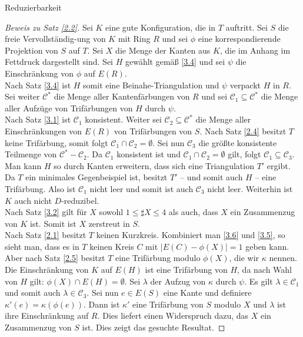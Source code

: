 \begin{section}{Reduzierbarkeit}
 \begin{proof}[Beweis zu Satz \ref{2.2}]
  Sei $K$ eine gute Konfiguration, die in $T$ auftritt. Sei $S$ die freie Vervollständig-ung von $K$ mit Ring $R$ und sei $\phi$ eine korrespondierende Projektion von $S$ auf $T$. Sei $X$ die Menge der Kanten aus $K$, die im Anhang im Fettdruck dargestellt sind. Sei $H$ gewählt gemäß \ref{3.4} und sei $\psi$ die Einschränkung von $\phi$ auf $E(R)$.\\
  Nach Satz \ref{3.4} ist $H$ somit eine Beinahe-Triangulation und $\psi$ verpackt $H$ in $R$. Sei weiter $\mathscr{C}^*$ die Menge aller Kantenfärbungen von $R$ und sei $\mathscr{C}_1 \subseteq \mathscr{C}^*$ die Menge aller Aufzüge von Trifärbungen von $H$ durch $\psi$.\\
  Nach Satz \ref{3.1} ist $\mathscr{C}_1$ konsistent. Weiter sei $\mathscr{C}_2 \subseteq \mathscr{C}^*$ die Menge aller Einschränkungen von $E(R)$ von Trifärbungen von $S$. Nach Satz \ref{2.4} besitzt $T$ keine Trifärbung, somit folgt $\mathscr{C}_1 \cap \mathscr{C}_2 = \emptyset$. Sei nun $\mathscr{C}_3$ die größte konsistente Teilmenge von $\mathscr{C}^* - \mathscr{C}_2$. Da $\mathscr{C}_1$ konsistent ist und $\mathscr{C}_1 \cap \mathscr{C}_2 = \emptyset$ gilt, folgt $\mathscr{C}_1 \subseteq \mathscr{C}_3$.\\
  Man kann $H$ so durch Kanten erweitern, dass sich eine Triangulation $T'$ ergibt. Da $T$ ein minimales Gegenbeispiel ist, besitzt $T'$ -- und somit auch $H$ -- eine Trifärbung. Also ist $\mathscr{C}_1$ nicht leer und somit ist auch $\mathscr{C}_3$ nicht leer. Weiterhin ist $K$ auch nicht $D$-reduzibel.\\
  Nach Satz \ref{3.2} gilt für $X$ sowohl $1 \leq \sharp X \leq 4$ als auch, dass $X$ ein Zusammenzug von $K$ ist. Somit ist $X$ zerstreut in $S$. \\
  Nach Satz \ref{2.1} besitzt $T$ keinen Kurzkreis. Kombiniert man \ref{3.6} und \ref{3.5}, so sieht man, dass es in $T$ keinen Kreis $C$ mit $|E(C) - \phi(X)| = 1$ geben kann. Aber nach Satz \ref{2.5} besitzt $T$ eine Trifärbung modulo $\phi(X)$, die wir $\kappa$ nennen. Die Einschränkung von $K$ auf $E(H)$ ist eine Trifärbung von $H$, da nach Wahl von $H$ gilt: $\phi(X) \cap E(H) = \emptyset$. Sei $\lambda$ der Aufzug von $\kappa$ durch $\psi$. Es gilt $\lambda \in \mathscr{C}_1$ und somit auch  $\lambda \in \mathscr{C}_3$. Sei nun $e \in E(S)$ eine Kante und definiere $\kappa'(e) = \kappa(\phi(e))$. Dann ist $\kappa'$ eine Trifärbung von $S$ modulo $X$ und $\lambda$ ist ihre Einschränkung auf $R$. Dies liefert einen Widerspruch dazu, das $X$ ein Zusammenzug von $S$ ist. Dies zeigt das gesuchte Resultat.
 \end{proof}
\end{section}